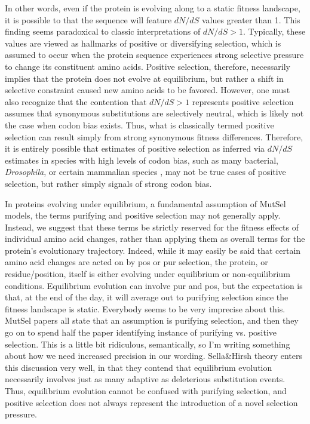\documentclass[11pt]{article}
\begin{document}
In other words, even if the protein is evolving along to a static fitness landscape, it is possible to that the sequence will feature $dN/dS$ values greater than 1. This finding seems paradoxical to classic interpretations of $dN/dS >1$. Typically, these values are viewed as hallmarks of positive or diversifying selection, which is assumed to occur when the protein sequence experiences strong selective pressure to change its constituent amino acids. Positive selection, therefore, necessarily implies that the protein does not evolve at equilibrium, but rather a shift in selective constraint caused new amino acids to be favored. However, one must also recognize that the contention that $dN/dS > 1$ represents positive selection assumes that synonymous substitutions are selectively neutral, which is likely not the case when codon bias exists. Thus, what is classically termed positive selection can result simply from strong synonymous fitness differences. Therefore, it is entirely possible that estimates of positive selection as inferred via $dN/dS$ estimates in species with high levels of codon bias, such as many bacterial, \textit{Drosophila}, or certain mammalian species \cite{Duret2002, Chamaryetal2006, HershbergPetrov2008, PlotkinKudla2010}, may not be true cases of positive selection, but rather simply signals of strong codon bias.


In proteins evolving under equilibrium, a fundamental assumption of MutSel models, the terms purifying and positive selection may not generally apply. Instead, we suggest that these terms be strictly reserved for the fitness effects of individual amino acid changes, rather than applying them as overall terms for the protein's evolutionary trajectory. Indeed, while it may easily be said that certain amino acid changes are acted on by pos or pur selection, the protein, or residue/position, itself is either evolving under equilibrium or non-equilibrium conditions. Equilibrium evolution can involve pur and pos, but the expectation is that, at the end of the day, it will average out to purifying selection since the fitness landscape is static. Everybody seems to be very imprecise about this. MutSel papers all state that an assumption is purifying selection, and then they go on to spend half the paper identifying instance of purifying vs. positive selection. This is a little bit ridiculous, semantically, so I'm writing something about how we need increased precision in our wording. Sella&Hirsh theory enters this discussion very well, in that they contend that equilibrium evolution necessarily involves just as many adaptive as deleterious substitution events. Thus, equilibrium evolution cannot be confused with purifying selection, and positive selection does not always represent the introduction of a novel selection pressure.
\end{document}
